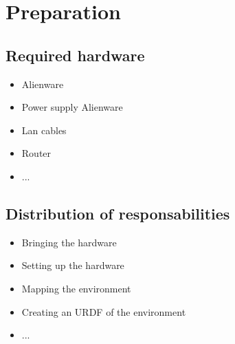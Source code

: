 \documentclass[main.tex]{subfiles}
\begin{document}
	\chapter{Preparation}
	\chapterauthor{}
	
	\section{Required hardware}
		\begin{itemize}
			\item Alienware
			\item Power supply Alienware
			\item Lan cables
			\item Router
			\item ... 
		\end{itemize}
	
	\section{Distribution of responsabilities}
		\begin{itemize}
			\item Bringing the hardware
			\item Setting up the hardware
			\item Mapping the environment
			\item Creating an URDF of the environment
			\item ...
		\end{itemize}
\end{document}
